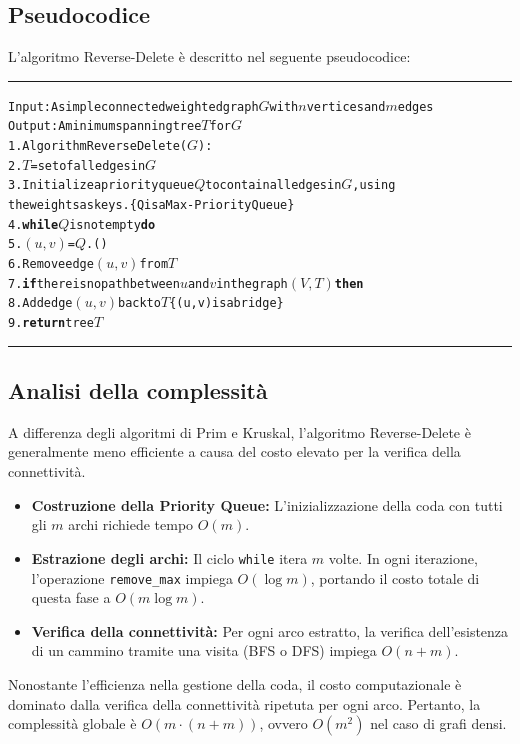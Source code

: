 \subsection*{Pseudocodice}
L'algoritmo Reverse-Delete è descritto nel seguente pseudocodice:

\vspace{1\baselineskip}
\hrule
\begin{alltt}
Input: A simple connected weighted graph \(G\) with \(n\) vertices and \(m\) edges
Output: A minimum spanning tree \(T\) for \(G\)
1.  Algorithm ReverseDelete(\(G\)):
2.      \(T\) = set of all edges in \(G\)
3.      Initialize a priority queue \(Q\) to contain all edges in \(G\), using 
             the weights as keys. \{Q is a Max-Priority Queue\}
4.      \textbf{while} \(Q\) is not empty \textbf{do}
5.          \((u, v)\) =  \(Q\).()
6.          Remove edge \((u, v)\) from \(T\)
7.          \textbf{if} there is no path between \(u\) and \(v\) in the graph \((V, T)\) \textbf{then}
8.              Add edge \((u, v)\) back to \(T\)  \{(u, v) is a bridge\}
9.      \textbf{return} tree \(T\)
\end{alltt}
\hrule 
\vspace{1\baselineskip}

\subsection*{Analisi della complessità}
A differenza degli algoritmi di Prim e Kruskal, l'algoritmo Reverse-Delete è generalmente meno efficiente a causa del costo elevato per la verifica della connettività.

\begin{itemize}[nosep]
    \item \textbf{Costruzione della Priority Queue:} L'inizializzazione della coda con tutti gli $m$ archi richiede tempo $O(m)$.
    \item \textbf{Estrazione degli archi:} Il ciclo \texttt{while} itera $m$ volte. In ogni iterazione, l'operazione \texttt{remove\_max} impiega $O(\log m)$, portando il costo totale di questa fase a $O(m \log m)$.
    \item \textbf{Verifica della connettività:} Per ogni arco estratto, la verifica dell'esistenza di un cammino tramite una visita (BFS o DFS) impiega $O(n+m)$.
\end{itemize}

\noindent
Nonostante l'efficienza nella gestione della coda, il costo computazionale è dominato dalla verifica della connettività ripetuta per ogni arco. Pertanto, la complessità globale è $O(m \cdot (n+m))$, ovvero $O(m^2)$ nel caso di grafi densi.




